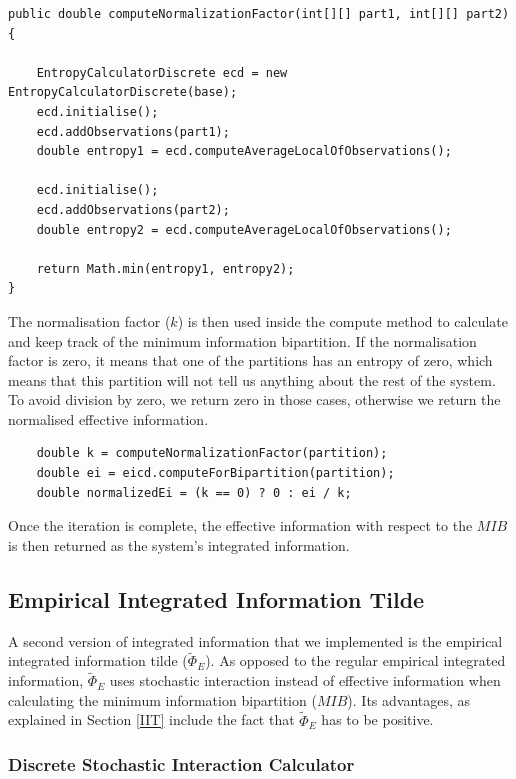 \documentclass[a4paper,11pt]{article}
\begin{document}
\begin{verbatim}
public double computeNormalizationFactor(int[][] part1, int[][] part2) {

	EntropyCalculatorDiscrete ecd = new EntropyCalculatorDiscrete(base);
	ecd.initialise();
	ecd.addObservations(part1);
	double entropy1 = ecd.computeAverageLocalOfObservations();

	ecd.initialise();
	ecd.addObservations(part2);
	double entropy2 = ecd.computeAverageLocalOfObservations();

	return Math.min(entropy1, entropy2);
}
\end{verbatim}

The normalisation factor ($k$) is then used inside the compute method to calculate and keep track of the minimum information bipartition. If the normalisation factor is zero, it means that one of the partitions has an entropy of zero, which means that this partition will not tell us anything about the rest of the system. To avoid division by zero, we return zero in those cases, otherwise we return the normalised effective information.

\begin{verbatim}
	double k = computeNormalizationFactor(partition);
	double ei = eicd.computeForBipartition(partition);
	double normalizedEi = (k == 0) ? 0 : ei / k;
\end{verbatim}

Once the iteration is complete, the effective information with respect to the $MIB$ is then returned as the system's integrated information. 

\subsection{Empirical Integrated Information Tilde}
\label{sec:impl:phi-e-tilde}

A second version of integrated information that we implemented is the empirical integrated information tilde ($\widetilde{\Phi}_{E}$). As opposed to the regular empirical integrated information, $\widetilde{\Phi}_{E}$ uses stochastic interaction instead of effective information when calculating the minimum information bipartition ($MIB$). Its advantages, as explained in Section \ref{IIT} include the fact that $\widetilde{\Phi}_{E}$ has to be positive.

\subsubsection{Discrete Stochastic Interaction Calculator}
\label{sec:impl:stochastic}
\end{document}
